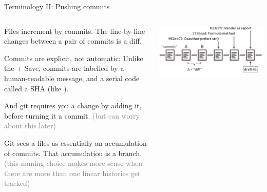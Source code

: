 \documentclass[ignorenonframetext, 10pt, aspectratio=169]{beamer}
\begin{document}
\begin{frame}{Terminology II: Pushing commits}
\begin{columns}[T]
\begin{column}{0.55\textwidth}
\begin{wideitemize}
\item<1-> Files increment by \alert{commit}s. The line-by-line changes between a pair of commits is a \alert{diff}.
\item<2-> Commits are explicit, not automatic: Unlike the  +  Save, commits are labelled by a human-readable \alert{message}, and a serial code called a \alert{SHA} (like ). 
\item<2->And git requires you  a change by \alert{add}ing it, before turning it a commit. \textcolor{gray}{(but can worry about this later)}
\item<3-> Git sees a files as essentially an accumulation of commits. That accumulation is a \alert{branch}. \textcolor{gray}{(this naming choice makes more sense when there are more than one linear histories get tracked)} 
\end{wideitemize}
\end{column}
\begin{column}{0.45\textwidth}
\includegraphics[width = \linewidth]{commit-diff-sha-tag.png}
\end{column}
\end{columns}
\end{frame}
\end{document}
